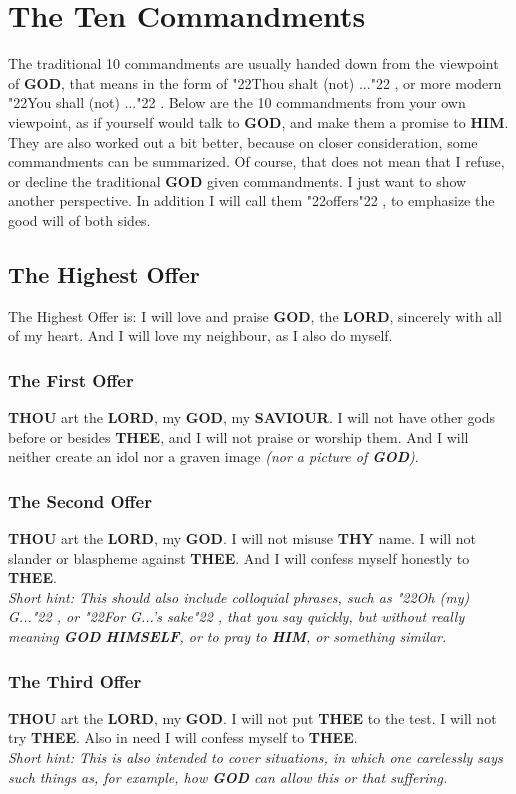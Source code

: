 \documentclass[12pt,a5paper]{article}
\newcommand{\God}[0]{\textbf{GOD}}
\newcommand{\Him}[0]{\textbf{HIM}}
\newcommand{\Himself}[0]{\textbf{HIMSELF}}
\newcommand{\Lord}[0]{\textbf{LORD}}
\newcommand{\Saviour}[0]{\textbf{SAVIOUR}}
\newcommand{\Thee}[0]{\textbf{THEE}}
\newcommand{\Thou}[0]{\textbf{THOU}}
\newcommand{\Thy}[0]{\textbf{THY}}
\newcommand{\q}[1]{\char"22{#1}\char"22 }
\begin{document}
	\newpage
	\section{The Ten Commandments}
		The traditional 10 commandments are usually handed down from the viewpoint of {\God},
		that means in the form of \q{Thou shalt (not) ...},
		or more modern \q{You shall (not) ...}.
		Below are the 10 commandments from your own viewpoint,
		as if yourself would talk to {\God},
		and make them a promise to {\Him}.
		They are also worked out a bit better,
		because on closer consideration,
		some commandments can be summarized.
		Of course,
		that does not mean that I refuse,
		or decline the traditional {\God} given commandments.
		I just want to show another perspective.
		In addition I will call them \q{offers},
		to emphasize the good will of both sides.
	
	\subsection{The Highest Offer}
		The Highest Offer is:
		I will love and praise {\God},
		the {\Lord},
		sincerely with all of my heart.
		And I will love my neighbour,
		as I also do myself.
		
	\subsubsection{The First Offer}
		{\Thou} art the {\Lord},
		my {\God},
		my {\Saviour}.
		I will not have other gods before or besides {\Thee},
		and I will not praise or worship them.
		And I will neither create an idol nor a graven image
		\textit{(nor a picture of {\God})}.
		
	\subsubsection{The Second Offer}
		{\Thou} art the {\Lord},
		my {\God}.
		I will not misuse {\Thy} name.
		I will not slander or blaspheme against {\Thee}.
		And I will confess myself honestly to {\Thee}.
		\\
		\textit{Short hint:
		This should also include colloquial phrases,
		such as \q{Oh (my) G...},
		or \q{For G...'s sake},
		that you say quickly,
		but without really meaning {\God} {\Himself},
		or to pray to {\Him},
		or something similar.}
			
	\subsubsection{The Third Offer}
		{\Thou} art the {\Lord},
		my {\God}.
		I will not put {\Thee} to the test.
		I will not try {\Thee}.
		Also in need I will confess myself to {\Thee}.
		\\
		\textit{Short hint:
		This is also intended to cover situations,
		in which one carelessly says such things as,
		for example,
		how {\God} can allow this or that suffering.}
		
\end{document}
